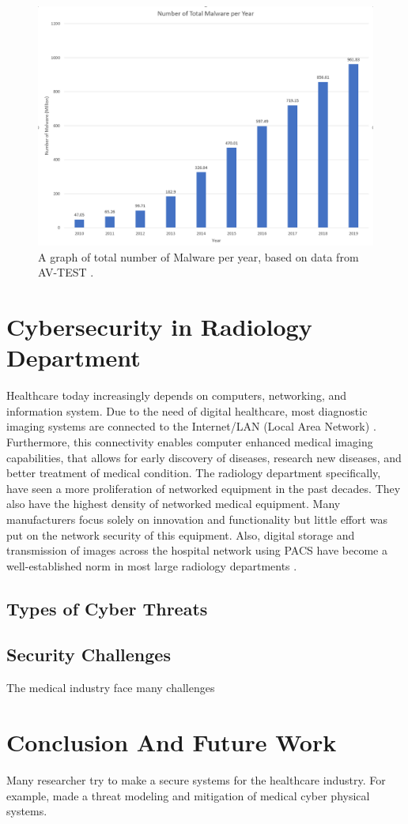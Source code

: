 \documentclass[pdf,bookmarks,colorlinks=true]{IEEEtran}
\begin{document}
\begin{figure}
	\centering
	\includegraphics[width=0.7\linewidth]{"Total Number Of Malware per Year"}
	\caption{A graph of total number of Malware per year, based on data from AV-TEST \cite{AVtest}.}
	\label{fig:total-number-of-malware-per-year}
\end{figure}


\section{Cybersecurity in Radiology Department}
\label{sec:Radiology}
Healthcare today increasingly depends on computers, networking, and information system. Due to the need of digital healthcare, most diagnostic imaging systems are connected to the Internet/LAN (Local Area Network) \cite{ma2019medical}. Furthermore, this connectivity enables computer enhanced medical imaging capabilities, that allows for early discovery of diseases, research new diseases, and better treatment of medical condition.  The radiology department specifically, have seen a more proliferation of networked equipment in the past decades. They also have the highest density of networked medical equipment. Many manufacturers focus solely on innovation and functionality but little effort was put on the network security of this equipment. Also, digital storage and transmission of images across the hospital network using PACS have become a well-established norm in most large radiology departments \cite{moses2015lack}. 

\subsection{Types of Cyber Threats}

\subsection{Security Challenges}
The medical industry face many challenges 

\section{Conclusion And Future Work}
\label{sec:Conclusion}

Many researcher try to make a secure systems for the healthcare industry. For example, \cite{Almohri:2017:TMM:3204094.3204113} made a threat modeling and mitigation of medical cyber physical systems. 





\end{document}
